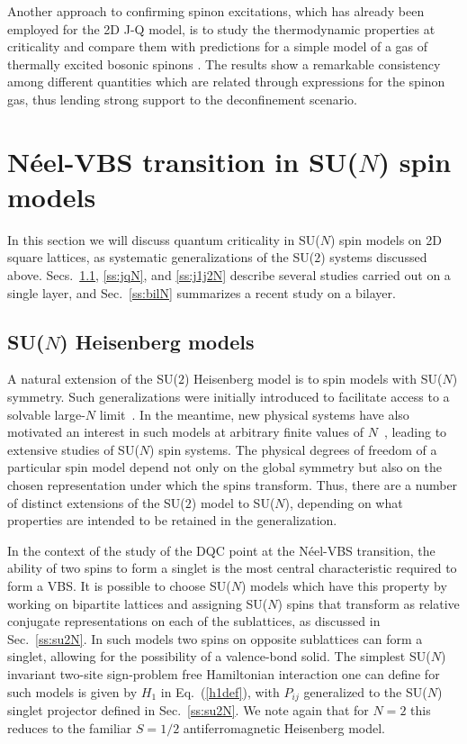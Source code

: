 \documentclass[range]{ar2e}
\begin{document}
Another approach to confirming spinon excitations, which has already been employed for the 2D J-Q model, is to study the thermodynamic properties at 
criticality and compare them with predictions for a simple model of a gas of thermally excited bosonic spinons \cite{Sandvik11a}. The results show a remarkable 
consistency among different quantities which are related through expressions for the spinon gas, thus lending strong support to the deconfinement scenario.

\section{N\'eel-VBS transition in SU($N$) spin models}
\label{sec:sunmodels}

In this section we will discuss quantum criticality in SU($N$) spin models on 2D square lattices, as systematic generalizations of the SU($2$) systems 
discussed above. Secs.~\ref{ss:j1N}, \ref{ss:jqN}, and \ref{ss:j1j2N} describe several studies carried out on a single layer, and Sec.~\ref{ss:bilN} summarizes 
a recent study on a bilayer. 

\subsection{SU($N$) Heisenberg models}
\label{ss:j1N}
A natural extension of the SU($2$) Heisenberg model is to spin models with SU($N$) symmetry. Such generalizations were initially introduced to
facilitate access to a solvable large-$N$ limit~\cite{affleck1985:lgN,Read89}. In the meantime, new physical systems have also motivated an interest 
in such models at arbitrary finite values of $N$~\cite{gorshkov2010:sun,kugel1982:kk}, leading to extensive studies of SU($N$) spin systems. The 
physical degrees of freedom of a particular spin model depend not only on the global symmetry but also on the chosen representation under which the 
spins transform. Thus, there are a number of distinct extensions of the SU($2$) model to SU($N$), depending on what properties are intended to be retained 
in the generalization. 

In the context of the study of the DQC point at the N\'eel-VBS transition, the ability of two spins to form a singlet is the most
central characteristic required to form a VBS. It is possible to choose SU($N$) models which have this property by working on bipartite lattices and
assigning SU($N$) spins that transform as relative conjugate representations on each of the sublattices, as discussed in Sec.~\ref{ss:su2N}. In such 
models two spins on opposite sublattices can form a singlet, allowing for the possibility of a valence-bond solid.  The simplest 
SU($N$) invariant two-site sign-problem free Hamiltonian interaction one can define for such models is given by $H_1$ in Eq.~(\ref{h1def}), with $P_{ij}$ 
generalized to the SU($N$) singlet projector defined in Sec.~\ref{ss:su2N}. We note again that for $N=2$ this reduces to the familiar $S=1/2$ 
antiferromagnetic Heisenberg model. 
\end{document}
